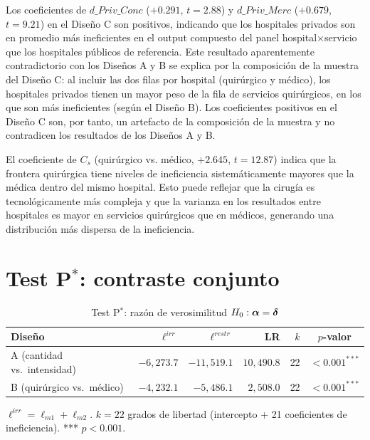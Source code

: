 Los coeficientes de $d\_Priv\_Conc$ ($+0.291$, $t=2.88$) y $d\_Priv\_Merc$ ($+0.679$, $t=9.21$) en el Diseño C son positivos, indicando que los hospitales privados son en promedio más ineficientes en el output compuesto del panel hospital$\times$servicio que los hospitales públicos de referencia. Este resultado aparentemente contradictorio con los Diseños A y B se explica por la composición de la muestra del Diseño C: al incluir las dos filas por hospital (quirúrgico y médico), los hospitales privados tienen un mayor peso de la fila de servicios quirúrgicos, en los que son más ineficientes (según el Diseño B). Los coeficientes positivos en el Diseño C son, por tanto, un artefacto de la composición de la muestra y no contradicen los resultados de los Diseños A y B.

El coeficiente de $C_s$ (quirúrgico vs. médico, $+2.645$, $t=12.87$) indica que la frontera quirúrgica tiene niveles de ineficiencia sistemáticamente mayores que la médica dentro del mismo hospital. Esto puede reflejar que la cirugía es tecnológicamente más compleja y que la varianza en los resultados entre hospitales es mayor en servicios quirúrgicos que en médicos, generando una distribución más dispersa de la ineficiencia.


\section{Test \texorpdfstring{P$^*$}{P*}: contraste conjunto}
\label{sec:test_pstar}

\begin{table}[htbp]
\centering
\caption{Test P$^*$: razón de verosimilitud $H_0: \boldsymbol{\alpha} = \boldsymbol{\delta}$}
\label{tab:test_pstar}
\begin{threeparttable}
\begin{tabular}{lrrrrc}
\toprule
\textbf{Diseño} & $\ell^{irr}$ & $\ell^{restr}$ &
\textbf{LR} & $k$ & \textbf{$p$-valor} \\
\midrule
A (cantidad vs.\ intensidad) &
  $-6{,}273.7$ & $-11{,}519.1$ &
  $10{,}490.8$ & 22 & $<0.001^{***}$ \\
B (quirúrgico vs.\ médico) &
  $-4{,}232.1$ & $-5{,}486.1$ &
  $2{,}508.0$ & 22 & $<0.001^{***}$ \\
\bottomrule
\end{tabular}
\begin{tablenotes}
  \small
  \item $\ell^{irr} = \ell_{m1} + \ell_{m2}$. $k = 22$ grados de libertad (intercepto + 21 coeficientes de ineficiencia). *** $p<0.001$.
\end{tablenotes}
\end{threeparttable}
\end{table}


